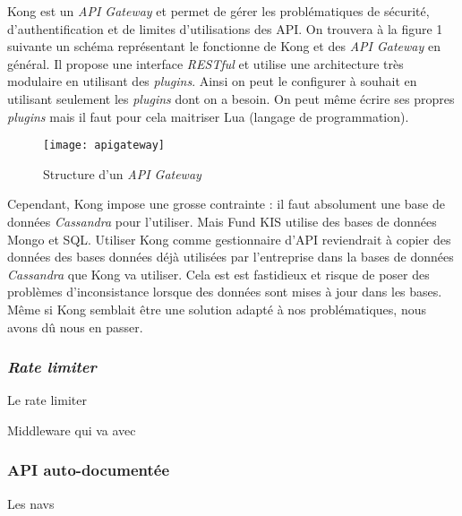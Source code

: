 \vspace{3mm}

Kong est un \textit{API Gateway} et permet de gérer les problématiques de sécurité, d'authentification et de limites d'utilisations des API. On trouvera à la figure 1 suivante un schéma représentant le fonctionne de Kong et des \textit{API Gateway} en général. Il propose une interface \textit{RESTful} et utilise une architecture très modulaire en utilisant des \textit{plugins}. Ainsi on peut le configurer à souhait en utilisant seulement les \textit{plugins} dont on a besoin. On peut même écrire ses propres \textit{plugins} mais il faut pour cela maitriser Lua (langage de programmation).

\begin{figure}[!h]
\centering
\texttt{[image: apigateway]}
\caption{Structure d'un \textit{API Gateway}}
\end{figure}

\vspace{3mm}

Cependant, Kong impose une grosse contrainte : il faut absolument une base de données \textit{Cassandra} pour l'utiliser. Mais Fund KIS utilise des bases de données Mongo et SQL. Utiliser Kong comme gestionnaire d'API reviendrait à copier des données des bases données déjà utilisées par l'entreprise dans la bases de données \textit{Cassandra} que Kong va utiliser. Cela est est fastidieux et risque de poser des problèmes d'inconsistance lorsque des données sont mises à jour dans les bases. Même si Kong semblait être une solution adapté à nos problématiques, nous avons dû nous en passer.


\subsubsection{\textit{Rate limiter}}
Le rate limiter

\vspace{3mm}

Middleware qui va avec


\subsubsection{API auto-documentée}
Les navs




%
